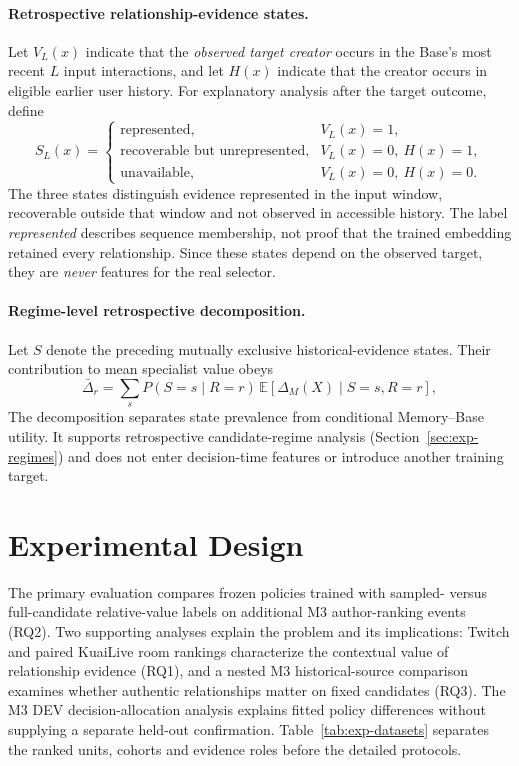 \paragraph{Retrospective relationship-evidence states.}
\label{sec:framework-states}
Let $V_L(x)$ indicate that the \emph{observed target creator} occurs in the Base's most recent $L$ input interactions, and let $H(x)$ indicate that the creator occurs in eligible earlier user history. For explanatory analysis after the target outcome, define
\begin{equation}
S_L(x)=
\begin{cases}
\text{represented},&V_L(x)=1,\\
\text{recoverable but unrepresented},&V_L(x)=0,\ H(x)=1,\\
\text{unavailable},&V_L(x)=0,\ H(x)=0.
\end{cases}
\label{eq:diagnostic-states}
\end{equation}
The three states distinguish evidence represented in the input window, recoverable outside that window and not observed in accessible history. The label \emph{represented} describes sequence membership, not proof that the trained embedding retained every relationship. Since these states depend on the observed target, they are \emph{never} features for the real selector.

\paragraph{Regime-level retrospective decomposition.}
\label{sec:regime-decomposition}
Let $S$ denote the preceding mutually exclusive historical-evidence states. Their contribution to mean specialist value obeys
\begin{equation}
    \bar{\Delta}_r
    =\sum_s P(S=s\mid R=r)
    \,\mathbb{E}\!\left[\Delta_M(X)\mid S=s,R=r\right],
    \label{eq:regime-decomposition}
\end{equation}
The decomposition separates state prevalence from conditional Memory--Base utility. It supports retrospective candidate-regime analysis (Section~\ref{sec:exp-regimes}) and does not enter decision-time features or introduce another training target.

\section{Experimental Design}
\label{sec:experimental-setup}

The primary evaluation compares frozen policies trained with sampled- versus full-candidate relative-value labels on additional M3 author-ranking events (RQ2). Two supporting analyses explain the problem and its implications: Twitch and paired KuaiLive room rankings characterize the contextual value of relationship evidence (RQ1), and a nested M3 historical-source comparison examines whether authentic relationships matter on fixed candidates (RQ3). The M3 DEV decision-allocation analysis explains fitted policy differences without supplying a separate held-out confirmation. Table~\ref{tab:exp-datasets} separates the ranked units, cohorts and evidence roles before the detailed protocols.


